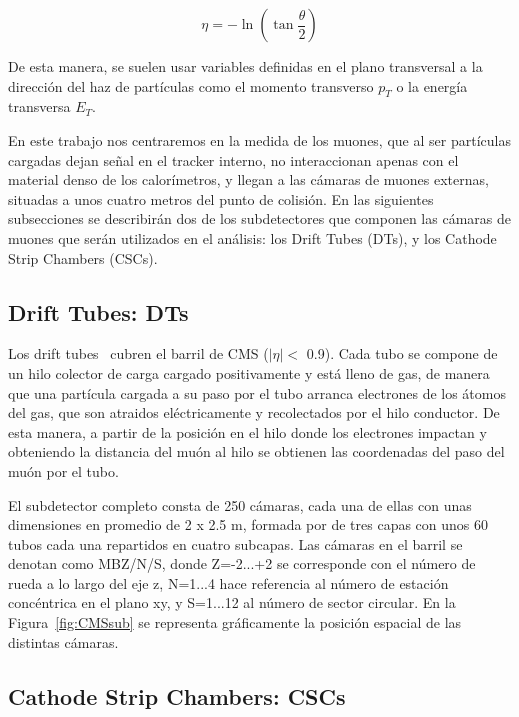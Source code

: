 \begin{equation}
  \eta = -\ln\left(\tan\dfrac{\theta}{2}\right)
\label{eq:eta}
\end{equation}


De esta manera, se suelen usar variables definidas en el plano transversal a la dirección del haz de partículas como el momento transverso $p_{T}$ o la energía transversa $E_{T}$. 

En este trabajo nos centraremos en la medida de los muones, que al ser part\'iculas cargadas dejan se\~nal en el tracker interno, no interaccionan apenas con el material denso de los calor\'imetros, y llegan a las c\'amaras de muones externas, situadas a unos cuatro metros del punto de colisi\'on. En las siguientes subsecciones se describir\'an dos de los subdetectores que componen las c\'amaras de muones que ser\'an utilizados en el an\'alisis: los Drift Tubes (DTs), y los Cathode Strip Chambers (CSCs).

\subsection{Drift Tubes: DTs}\label{sec:DTs}

Los drift tubes~\cite{DTperformance} cubren el barril de CMS ($\lvert \eta \rvert <$ 0.9). Cada tubo se compone de un hilo colector de carga cargado positivamente y est\'a lleno de gas, de manera que una part\'icula cargada a su paso por el tubo arranca electrones de los \'atomos del gas, que son atraidos el\'ectricamente y recolectados por el hilo conductor. De esta manera, a partir de la posici\'on en el hilo donde los electrones impactan y obteniendo la distancia del mu\'on al hilo se obtienen las coordenadas del paso del mu\'on por el tubo.

El subdetector completo consta de 250 c\'amaras, cada una de ellas con unas dimensiones en promedio de 2 x 2.5 m, formada por de tres capas con unos 60 tubos cada una repartidos en cuatro subcapas. Las c\'amaras en el barril se denotan como MBZ/N/S, donde Z=-2...+2 se corresponde con el n\'umero de rueda a lo largo del eje z, N=1...4 hace referencia al n\'umero de estaci\'on conc\'entrica en el plano xy, y S=1...12 al n\'umero de sector circular. En la Figura~\ref{fig:CMSsub} se representa gr\'aficamente la posici\'on espacial de las distintas c\'amaras.


\subsection{Cathode Strip Chambers: CSCs}\label{sec:CSCs}

